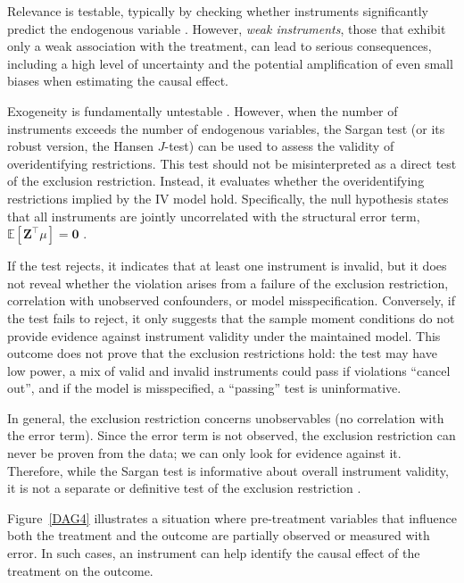 Relevance is testable, typically by checking whether instruments significantly predict the endogenous variable \cite{staiger1997instrumental,cragg1993testing,kleibergen2006generalized,stock2005asymptotic}. However, \textit{weak instruments}, those that exhibit only a weak association with the treatment, can lead to serious consequences, including a high level of uncertainty and the potential amplification of even small biases when estimating the causal effect.

Exogeneity is fundamentally untestable \cite{imbens1994identification}. However, when the number of instruments exceeds the number of endogenous variables, the Sargan test (or its robust version, the Hansen $J$-test) can be used to assess the validity of overidentifying restrictions. This test should not be misinterpreted as a direct test of the exclusion restriction. Instead, it evaluates whether the overidentifying restrictions implied by the IV model hold. Specifically, the null hypothesis states that all instruments are jointly uncorrelated with the structural error term, $\mathbb{E}[\mathbf{Z}^\top \mu] = \mathbf{0}$ \cite{sargan1958econometric,hansen1982large}. 

If the test rejects, it indicates that at least one instrument is invalid, but it does not reveal whether the violation arises from a failure of the exclusion restriction, correlation with unobserved confounders, or model misspecification. Conversely, if the test fails to reject, it only suggests that the sample moment conditions do not provide evidence against instrument validity under the maintained model. This outcome does not prove that the exclusion restrictions hold: the test may have low power, a mix of valid and invalid instruments could pass if violations ``cancel out'', and if the model is misspecified, a ``passing'' test is uninformative. 

In general, the exclusion restriction concerns unobservables (no correlation with the error term). Since the error term is not observed, the exclusion restriction can never be proven from the data; we can only look for evidence against it. Therefore, while the Sargan test is informative about overall instrument validity, it is not a separate or definitive test of the exclusion restriction \cite{wooldridge2010econometric,hayashi2000econometrics}.

Figure~\ref{DAG4} illustrates a situation where pre-treatment variables that influence both the treatment and the outcome are partially observed or measured with error. In such cases, an instrument can help identify the causal effect of the treatment on the outcome.

